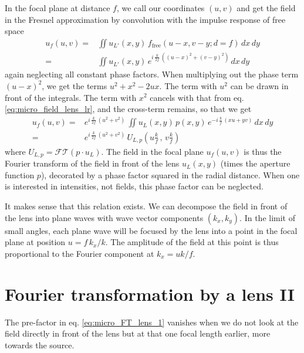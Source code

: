 In the focal plane at distance $f$, we call our coordinates $(u,v)$ and get the field in the Fresnel approximation by convolution with the impulse response of free space
\begin{align}
    u_f(u,v) = & \iint  u_{L'}(x,y) \, f_\text{free}( u - x, v - y; d = f)  \, dx \, dy \\
    = & \iint  u_{L'}(x,y)  \,
     e^{i \, \frac{k}{2f} \, ( ( u - x)^2 + (v -y)^2) } \, dx \, dy
\end{align}
again neglecting all constant phase factors. When multiplying out the phase term $(u-x)^2$, we get the terms $u^2 + x^2 - 2ux$. The term with $u^2$ can be drawn in front of the integrals. The term with $x^2$ cancels with that from eq.  \ref{eq:micro_field_lens_lr}, and the cross-term remains, so that we get
\begin{align}
    u_f(u,v) = & e^{i \, \frac{k}{2f} \, ( u^2 + v^2) } \,
    \iint  u_{L}(x,y) \, p(x,y) \,  e^{-i \,   \frac{k}{f} \, ( xu + yv) } \, dx \, dy \\
 = & e^{i \, \frac{k}{2f} \, ( u^2 + v^2) } \, U_{L,p} \left(u \frac{k}{f} \,  , \,  v \frac{k}{f} \right) \label{eq:micro_FT_lens_1}
\end{align}
where $U_{L,p} = \mathcal{FT} \left(p \cdot u_L   \right)$. The field in the focal plane $u_f(u,v)$ is thus the Fourier transform of the field in front of the lens $u_L(x,y)$ (times the aperture function $p$), decorated by a phase factor squared in the radial distance. When one is interested in intensities, not fields, this phase factor can be neglected.

It makes sense that this relation exists. We can decompose the field in front of the lens into plane waves with wave vector components $(k_x, k_y)$. In the limit of small angles, each plane wave will be focused by the lens into a point in the focal plane at  position $u = f \,  k_x / k$. The amplitude of the field at  this point is thus proportional to the Fourier component  at $k_x = u k / f$.





\section{Fourier transformation by a lens II}


The pre-factor in eq.  \ref{eq:micro_FT_lens_1} vanishes when we do not look at the field directly in front of the lens but at that  one focal length earlier, more towards the source.


